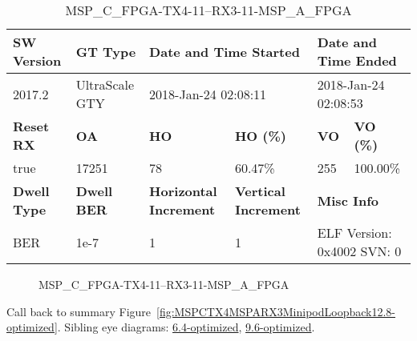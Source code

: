 \begin{table}[h]
\centering
\caption{MSP\_C\_FPGA-TX4-11--RX3-11-MSP\_A\_FPGA}
\label{tab:MSPCFPGATX411RX311MSPAFPGA12.8-optimized}
\begin{tabular}{@{}|l|l|l|l|l|l|@{}}
\toprule
\textbf{SW Version}                & \textbf{GT Type}   & \multicolumn{2}{l|}{\textbf{Date and Time Started}}            & \multicolumn{2}{l|}{\textbf{Date and Time Ended}}        \\ \midrule
2017.2                       & UltraScale GTY          & \multicolumn{2}{l|}{2018-Jan-24 02:08:11}                   & \multicolumn{2}{l|}{2018-Jan-24 02:08:53}               \\ \midrule
\textbf{Reset RX}                  & \textbf{OA} & \textbf{HO}   & \textbf{HO (\%)} & \textbf{VO} & \textbf{VO (\%)} \\ \midrule
true & 17251        & 78          & 60.47\%        & 255        & 100.00\%       \\ \midrule
\textbf{Dwell Type}                & \textbf{Dwell BER} & \textbf{Horizontal Increment} & \textbf{Vertical Increment}    & \multicolumn{2}{l|}{\textbf{Misc Info}}                  \\ \midrule
BER                            & 1e-7        & 1        & 1           & \multicolumn{2}{l|}{ELF Version: 0x4002 SVN: 0}                         \\ \bottomrule
\end{tabular}
\end{table}

\begin{figure}[h]
\caption{MSP\_C\_FPGA-TX4-11--RX3-11-MSP\_A\_FPGA} \label{fig:MSPCFPGATX411RX311MSPAFPGA12.8-optimized}
\end{figure}

Call back to summary Figure~\ref{fig:MSPCTX4MSPARX3MinipodLoopback12.8-optimized}.
Sibling eye diagrams: \hyperref[sec:MSPCFPGATX411RX311MSPAFPGA6.4-optimized]{6.4-optimized}, \hyperref[sec:MSPCFPGATX411RX311MSPAFPGA9.6-optimized]{9.6-optimized}.

\clearpage
\newpage

